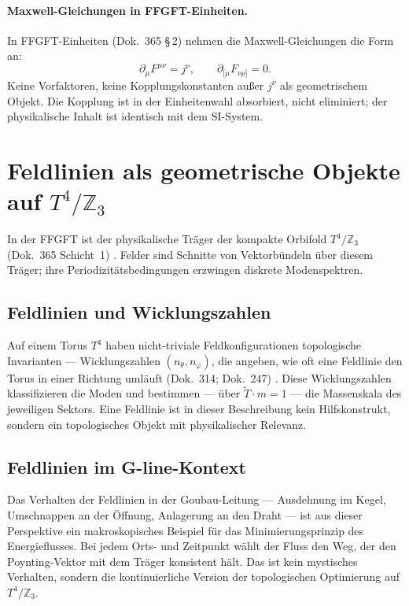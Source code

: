 \paragraph{Maxwell-Gleichungen in FFGFT-Einheiten.}
In FFGFT-Einheiten (Dok.~365 §\,2) nehmen die Maxwell-Gleichungen die Form an:
\[
  \partial_\mu F^{\mu\nu} = j^\nu, \qquad \partial_{[\mu}F_{\nu\rho]}=0.
\]
Keine Vorfaktoren, keine Kopplungskonstanten außer $j^\nu$ als geometrischem
Objekt. Die Kopplung ist in der Einheitenwahl absorbiert, nicht eliminiert;
der physikalische Inhalt ist identisch mit dem SI-System.

\section{Feldlinien als geometrische Objekte auf $T^4/\mathbb{Z}_3$}

In der FFGFT ist der physikalische Träger der kompakte Orbifold
$T^4/\mathbb{Z}_3$ (Dok.~365 Schicht~1) \SetzM. Felder sind Schnitte von
Vektorbündeln über diesem Träger; ihre Pe\-ri\-o\-di\-zi\-täts\-be\-din\-gun\-gen erzwingen
diskrete Modenspektren.

\subsection*{Feldlinien und Wicklungszahlen}

Auf einem Torus $T^4$ haben nicht-triviale Feldkonfigurationen
topologische Invarianten --- Wicklungszahlen $(n_\theta, n_\varphi)$,
die angeben, wie oft eine Feldlinie den Torus in einer Richtung umläuft
(Dok.~314; Dok.~247) \BM. Diese Wicklungszahlen klassifizieren die
Moden und bestimmen --- über $\tilde{T}\cdot m=1$ --- die Massenskala des
jeweiligen Sektors. Eine Feldlinie ist in dieser Beschreibung kein
Hilfskonstrukt, sondern ein topologisches Objekt mit physikalischer
Relevanz.

\subsection*{Feldlinien im G-line-Kontext}

Das Verhalten der Feldlinien in der Goubau-Leitung --- Ausdehnung im Kegel,
Umschnappen an der Öffnung, Anlagerung an den Draht --- ist aus dieser
Perspektive ein makroskopisches Beispiel für das Minimierungsprinzip des
Energieflusses. Bei jedem Orts- und Zeitpunkt wählt der Fluss den Weg,
der den Poynting-Vektor mit dem Träger konsistent hält. Das ist kein
mystisches Verhalten, sondern die kontinuierliche Version der topologischen
Optimierung auf $T^4/\mathbb{Z}_3$.

